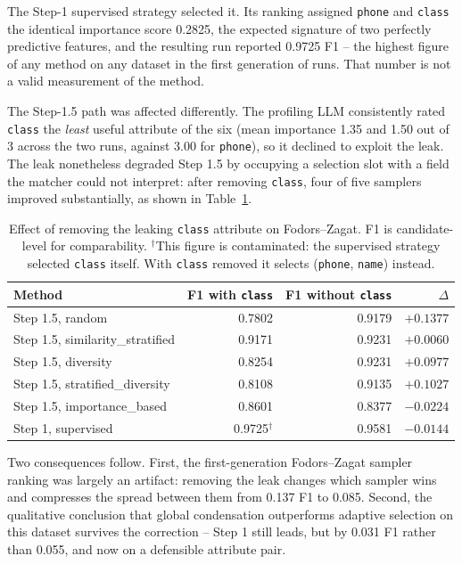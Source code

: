 \documentclass[11pt]{article}
\begin{document}
The Step-1 supervised strategy selected it. Its ranking assigned \texttt{phone} and
\texttt{class} the identical importance score 0.2825, the expected signature of two
perfectly predictive features, and the resulting run reported 0.9725 F1 -- the
highest figure of any method on any dataset in the first generation of runs. That
number is not a valid measurement of the method.

The Step-1.5 path was affected differently. The profiling LLM consistently rated
\texttt{class} the \emph{least} useful attribute of the six (mean importance 1.35
and 1.50 out of 3 across the two runs, against 3.00 for \texttt{phone}), so it
declined to exploit the leak. The leak nonetheless degraded Step 1.5 by occupying a
selection slot with a field the matcher could not interpret: after removing
\texttt{class}, four of five samplers improved substantially, as shown in
Table~\ref{tab:leak-effect}.

\begin{table}[htbp]
\centering
\small
\begin{tabular}{lrrr}
\toprule
Method & F1 with \texttt{class} & F1 without \texttt{class} & $\Delta$ \\
\midrule
Step 1.5, random & 0.7802 & 0.9179 & $+0.1377$ \\
Step 1.5, similarity\_stratified & 0.9171 & 0.9231 & $+0.0060$ \\
Step 1.5, diversity & 0.8254 & 0.9231 & $+0.0977$ \\
Step 1.5, stratified\_diversity & 0.8108 & 0.9135 & $+0.1027$ \\
Step 1.5, importance\_based & 0.8601 & 0.8377 & $-0.0224$ \\
Step 1, supervised & 0.9725$^\dagger$ & 0.9581 & $-0.0144$ \\
\bottomrule
\end{tabular}
\caption{Effect of removing the leaking \texttt{class} attribute on Fodors--Zagat.
F1 is candidate-level for comparability. $^\dagger$This figure is contaminated:
the supervised strategy selected \texttt{class} itself. With \texttt{class} removed
it selects (\texttt{phone}, \texttt{name}) instead.}
\label{tab:leak-effect}
\end{table}

Two consequences follow. First, the first-generation Fodors--Zagat sampler ranking
was largely an artifact: removing the leak changes which sampler wins and compresses
the spread between them from 0.137 F1 to 0.085. Second, the qualitative conclusion
that global condensation outperforms adaptive selection on this dataset survives the
correction -- Step 1 still leads, but by 0.031 F1 rather than 0.055, and now on a
defensible attribute pair.
\end{document}
